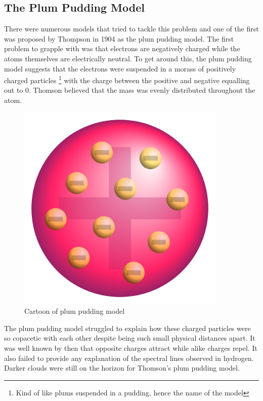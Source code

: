 \subsection{The Plum Pudding Model}

There were numerous models that tried to tackle this problem and one of the first was proposed by Thompson in 1904 as the plum pudding model.
The first problem to grapple with was that electrons are negatively charged while the atoms themselves are electrically neutral.
To get around this, the plum pudding model suggests that  the electrons were suspended in a morass of positively charged particles
\footnote{Kind of like plums suspended in a pudding, hence the name of the model}
with the charge between the positive  and negative equalling out to 0.
Thomson believed that the mass was evenly distributed throughout the atom.

\begin{figure}[H]
  \centering
  \includegraphics[width=100mm]{figures/plumPudding.png}
  \caption{Cartoon of plum pudding model}
  \label{plumPudding}
\end{figure}

The plum pudding model struggled to explain how these charged particles were so copacetic with each other despite being such small physical distances apart.
It was well known by then that opposite charges attract while alike charges repel.
It also failed to provide any explanation of the spectral lines observed in hydrogen.
Darker clouds were still on the horizon for Thomson's plum pudding model.
